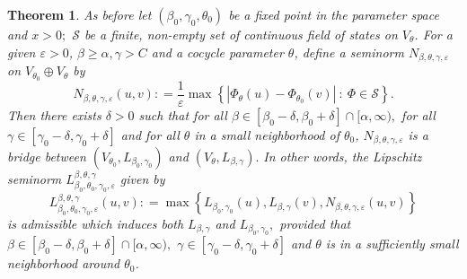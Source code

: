 \documentclass[a4paper,11pt,reqno]{amsart}
\theoremstyle{plain}
\newtheorem{thm}{Theorem}[section]
\theoremstyle{mainthmstyle}
\theoremstyle{named}
\numberwithin{equation}{section}
\begin{document}
\begin{thm}
As before let $(\beta_0, \gamma_0, \theta_0)$ be a fixed point in the parameter space and $x > 0;$ $\mathcal S$ be a finite, non-empty set of continuous field of states on $V_{\theta}$. For a given $\varepsilon > 0$, $\beta \geq \alpha,\gamma > C$ and a cocycle parameter $\theta$, define a seminorm $N_{\beta, \theta, \gamma, \varepsilon}$ on $V_{\theta_0} \oplus V_{\theta}$ by
$$N_{\beta, \theta, \gamma, \varepsilon} (u, v) : = \frac {1} {\varepsilon} \max \left \{\left\lvert \Phi_{\theta} (u) - \Phi_{\theta_0} (v) \right\rvert\ :\ \Phi \in \mathcal S \right\}.$$
Then there exists $\delta > 0$ such that for all $\beta \in \left [\beta_0 - \delta, \beta_0 + \delta \right ] \cap [\alpha, \infty),$ for all $\gamma \in \left [\gamma_0 - \delta, \gamma_0 + \delta \right ]$ and for all $\theta$ in a small neighborhood of $\theta_0$, $N_{\beta, \theta, \gamma, \varepsilon}$ is a bridge between $\left (V_{\theta_0}, L_{\beta_0, \gamma_0} \right )$ and $\left (V_{\theta}, L_{\beta, \gamma} \right ).$  In other words, the Lipschitz seminorm $L_{\beta_0, \theta_0, \gamma_0, \varepsilon}^{\beta,\theta,\gamma}$ given by $$L_{\beta_0, \theta_0, \gamma_0, \varepsilon}^{\beta,\theta,\gamma} (u, v) : = \max \left\{L_{\beta_0, \gamma_0} (u), L_{\beta, \gamma} (v), N_{\beta,\theta, \gamma, \varepsilon} (u, v) \right\}$$ is admissible which induces both $L_{\beta, \gamma}$ and $L_{\beta_0, \gamma_0},$ provided that $\beta \in \left [\beta_0 - \delta, \beta_0 + \delta \right ] \cap [\alpha, \infty),$ $\gamma \in \left [\gamma_0 - \delta, \gamma_0 + \delta \right ]$ and $\theta$ is in a sufficiently small neighborhood around $\theta_0$.
\end{thm}
\end{document}
